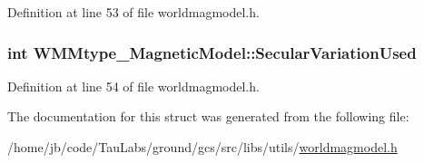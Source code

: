 \-Definition at line 53 of file worldmagmodel.\-h.

\hypertarget{struct_w_m_mtype___magnetic_model_aedce5f50c04bdcf6c244f5b1845ff6f4}{
\subsubsection[{\-Secular\-Variation\-Used}]{\setlength{\rightskip}{0pt plus 5cm}int {\bf \-W\-M\-Mtype\-\_\-\-Magnetic\-Model\-::\-Secular\-Variation\-Used}}}\label{struct_w_m_mtype___magnetic_model_aedce5f50c04bdcf6c244f5b1845ff6f4}


\-Definition at line 54 of file worldmagmodel.\-h.



\-The documentation for this struct was generated from the following file\-:\begin{DoxyCompactItemize}
\item 
/home/jb/code/\-Tau\-Labs/ground/gcs/src/libs/utils/\hyperlink{worldmagmodel_8h}{worldmagmodel.\-h}\end{DoxyCompactItemize}
